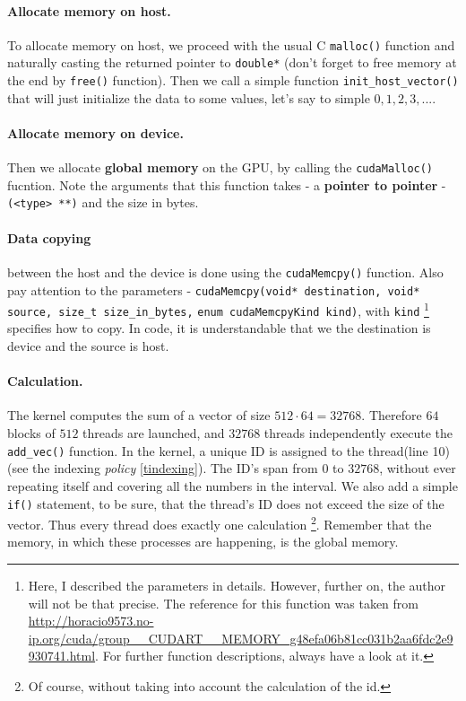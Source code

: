 \paragraph{Allocate memory on host.} To allocate memory on host, 
we proceed with the usual C \verb|malloc()| function and naturally 
casting the returned pointer to \verb|double*| (don't forget 
to free memory at the end by \verb|free()| function). 
Then we call a simple function \verb|init_host_vector()| that will just initialize the data 
to some values, let's say to simple $0,1,2,3, ...$. 
\paragraph{Allocate memory on device.} Then we allocate \textbf{global memory} on the GPU, 
by calling the \verb|cudaMalloc()| fucntion. Note the arguments that this function takes - 
a \textbf{pointer to pointer} - \verb|(<type> **)| and the size in bytes. 

 
\paragraph{Data copying} between the host and the device is done using the \verb|cudaMemcpy()| function. Also pay attention 
to the parameters - 
\verb|cudaMemcpy(void* destination, void* source, size_t size_in_bytes,| \newline \verb|enum cudaMemcpyKind kind)|,
with \verb|kind| \footnote{Here, I described the parameters in details. However, further on,
the author will not be that precise. The reference for this function was taken from 
\url{http://horacio9573.no-ip.org/cuda/group__CUDART__MEMORY_g48efa06b81cc031b2aa6fdc2e9930741.html}. 
For further function descriptions, always have a look at it.}
specifies how to copy. In code, it is understandable that we the destination is 
device and the source is host.

\vspace{-0.8cm}
\paragraph{Calculation.} The kernel computes the sum of a vector of size $512\cdot 64 = 32768$. 
Therefore $64$ blocks of $512$ threads are launched, and $32768$ threads independently execute the \verb|add_vec()|
function. In the kernel, a unique ID is assigned to the thread(line 10) (see the indexing \textit{policy} \autoref{tindexing}). 
The ID's span from $0$ to $32768$, without ever repeating itself and covering all the numbers in the interval.
We also add a simple \verb|if()| statement, to be sure, that the thread's ID does not exceed the size of the vector.
Thus every thread does exactly one calculation \footnote{Of course, without taking into account the calculation of the id.}.
Remember that the memory, in which these processes are happening, is the global memory. 

